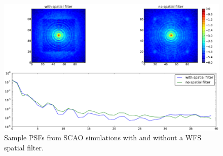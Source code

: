 \documentclass{article}
\begin{document}
\begin{figure}
\begin{center}
\includegraphics[width=20cm]{spatial_filter_example.eps}
\end{center}
\caption{Sample PSFs from SCAO simulations with and without a WFS spatial
filter. \label{fig:sfexamp1}}
\end{figure}

\printindex
\end{document}
